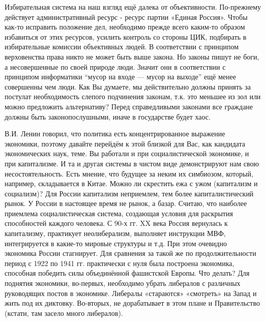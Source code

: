 \begin{drama}
	\michaelspeaks Избирательная система на наш взгляд ещё далека от объективности. По-прежнему действует административный ресурс - ресурс партии «Единая Россия». Чтобы как-то исправить положение дел, необходимо прежде всего каким-то образом избавиться от этих ресурсов, усилить контроль со стороны ЦИК, подбирать в избирательные комиссии объективных людей.	
	\maxspeaks В соответствии с принципом верховенства права никто не может быть выше закона. Но законы пишут не боги, а несовершенные по своей природе люди. Значит они в соответствии с принципом информатики “мусор на входе — мусор на выходе” ещё менее совершенны чем люди. Как Вы думаете, мы действительно должны принять за постулат необходимость слепого подчинения законам, т.к. это меньшее из зол или можно предложить альтернативу?  
	\michaelspeaks Перед справедливыми законами все граждане должны быть законопослушными, иначе в государстве будет хаос.

	\maxspeaks В.И. Ленин говорил, что политика есть концентрированное выражение экономики, поэтому давайте перейдём к этой близкой для Вас, как кандидата экономических наук, теме. Вы работали и при социалистической экономике, и при капитализме. И та и другая системы в чистом виде демонстрируют нам свою несостоятельность. Есть мнение, что будущее за неким их симбиозом, который, например, складывается в Китае. Можно ли скрестить ежа с ужом (капитализм и социализм)?
	\michaelspeaks Для России капитализм неприемлем, тем более капиталистический рынок. У России в настоящее время не рынок, а базар. Считаю, что наиболее приемлема социалистическая система, создающая условия для раскрытия способностей каждого человека.
	\maxspeaks С 90-х гг. XX века Россия вернулась к капитализму, практикует неолиберализм, выполняет инструкции МВФ, интегрируется в какие-то мировые структуры и т.д. При этом очевидно экономика России стагнирует. Для сравнения за такой же по продолжительности период с 1922 по 1941 гг. практически с нуля была построена экономика, способная победить силы объединённой фашистской Европы. Что делать? 
	\michaelspeaks Для поднятия экономики, во-первых, необходимо убрать либералов с различных руководящих постов в экономике. Либералы «стараются» «смотреть» на Запад и жить под их диктовку. Во-вторых, не дорабатывает в этом плане и Правительство (кстати, там засело много либералов).


\end{drama}
